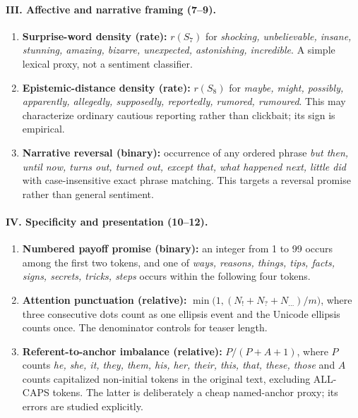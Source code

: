 \documentclass[11pt]{article}
\begin{document}
\paragraph{III. Affective and narrative framing (7--9).}
\begin{enumerate}[leftmargin=*,start=7,itemsep=2pt,topsep=2pt]
\item \textbf{Surprise-word density (rate):} $r(S_7)$ for \emph{shocking, unbelievable, insane, stunning, amazing, bizarre, unexpected, astonishing, incredible}. A simple lexical proxy, not a sentiment classifier.
\item \textbf{Epistemic-distance density (rate):} $r(S_8)$ for \emph{maybe, might, possibly, apparently, allegedly, supposedly, reportedly, rumored, rumoured}. This may characterize ordinary cautious reporting rather than clickbait; its sign is empirical.
\item \textbf{Narrative reversal (binary):} occurrence of any ordered phrase \emph{but then, until now, turns out, turned out, except that, what happened next, little did} with case-insensitive exact phrase matching. This targets a reversal promise rather than general sentiment.
\end{enumerate}

\paragraph{IV. Specificity and presentation (10--12).}
\begin{enumerate}[leftmargin=*,start=10,itemsep=2pt,topsep=2pt]
\item \textbf{Numbered payoff promise (binary):} an integer from 1 to 99 occurs among the first two tokens, and one of \emph{ways, reasons, things, tips, facts, signs, secrets, tricks, steps} occurs within the following four tokens.
\item \textbf{Attention punctuation (relative):} $\min\bigl(1,(N_{!}+N_{?}+N_{\ldots})/m\bigr)$, where three consecutive dots count as one ellipsis event and the Unicode ellipsis counts once. The denominator controls for teaser length.
\item \textbf{Referent-to-anchor imbalance (relative):} $P/(P+A+1)$, where $P$ counts \emph{he, she, it, they, them, his, her, their, this, that, these, those} and $A$ counts capitalized non-initial tokens in the original text, excluding ALL-CAPS tokens. The latter is deliberately a cheap named-anchor proxy; its errors are studied explicitly.
\end{enumerate}
\end{document}
